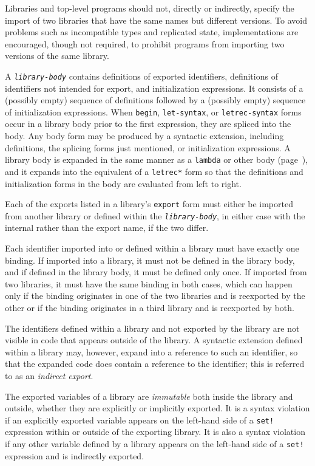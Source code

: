 Libraries and top-level programs should not, directly or indirectly,
specify the import of two libraries that have the same names but
different versions.
To avoid problems such as incompatible types and replicated state,
implementations are encouraged, though not required, to prohibit programs
from importing two versions of the same library.


\label{libraries_s14}A \texttt{\textit{library-body}} contains definitions of exported
identifiers, definitions of identifiers not intended for export, and
initialization expressions.
It consists of a (possibly empty) sequence of definitions followed by a
(possibly empty) sequence of initialization expressions.
When \texttt{begin}, \texttt{let-syntax}, or \texttt{letrec-syntax} forms
occur in a library body prior to the first expression, they are spliced
into the body.
Any body form may be produced by a syntactic extension, including
definitions, the splicing forms just mentioned, or initialization
expressions.
A library body is expanded in the same manner as a \texttt{lambda}
or other body (page \pageref{syntax_body_expansion}), and it expands into
the equivalent of a \texttt{letrec*} form so that the definitions
and initialization forms in the body are evaluated from left to right.


Each of the exports listed in a library's \texttt{export} form must either
be imported from another library or defined within the \texttt{\textit{library-body}},
in either case with the internal rather than the export name, if the two
differ.


Each identifier imported into or defined within a library must have
exactly one binding.
If imported into a library, it must not be defined in the library body,
and if defined in the library body, it must be defined only once.
If imported from two libraries, it must have the same binding in both
cases, which can happen only if the binding originates in one
of the two libraries and is reexported by the other or if the binding
originates in a third library and is reexported by both.


\label{libraries_s15}The identifiers defined within a library and not exported by the
library are not visible in code that appears outside of the library.
A syntactic extension defined within a library may, however,
expand into a reference to such an identifier, so that the expanded
code does contain a reference to the identifier; this is referred
to as an \textit{indirect export}.


\label{libraries_s16}The exported variables of a library are \textit{immutable} both inside the
library and outside, whether they are explicitly or implicitly exported.
It is a syntax violation if an explicitly exported variable appears on
the left-hand side of a \texttt{set!} expression within or outside of
the exporting library.
It is also a syntax violation if any other variable defined by a library
appears on the left-hand side of a \texttt{set!} expression and is
indirectly exported.


